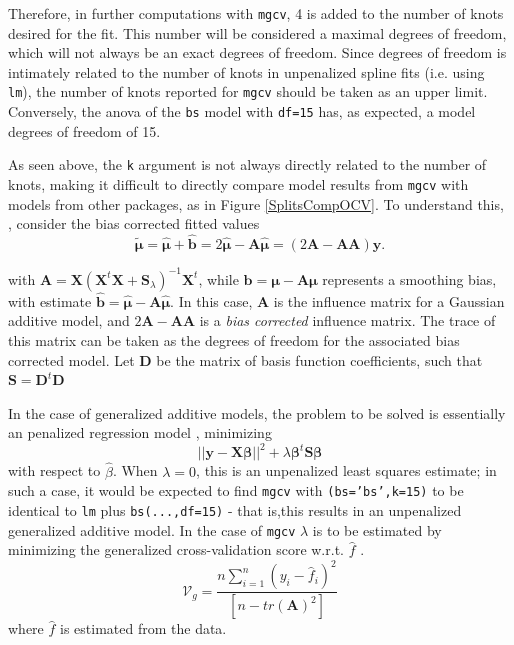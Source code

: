 \documentclass[phdcss]{SDSUThesis}
\begin{document}
Therefore, in further computations with \texttt{mgcv}, 4 is added to the number of knots desired for the fit. This number will be considered a maximal degrees of freedom, which will not always be an exact degrees of freedom. Since degrees of freedom is intimately related to the number of knots in unpenalized spline fits (i.e. using \texttt{lm}), the number of knots reported for \texttt{mgcv} should be taken as an upper limit.
Conversely, the anova of the \texttt{bs} model with \texttt{df=15} has, as expected, a model degrees of freedom of 15. 

As seen above, the \texttt{k} argument is not always directly related to the number of knots, making it difficult to directly compare model results from \texttt{mgcv} with models from other packages, as in Figure \ref{SplitsCompOCV}. To understand this, \cite{wood-2017}, consider the bias corrected fitted values 
\begin{equation}\label{EffectiveDF}
   \tilde{\mathbf{\mu}} = \widehat{\mathbf{\mu}} + \widehat{\mathbf{b}} = 2 \widehat{\mathbf{\mu}} - \mathbf{A} \widehat{\mathbf{\mu}} = \left( 2 \mathbf{A} - \mathbf{A} \mathbf{A}\right) \mathbf{y}.
\end{equation}

with $\mathbf{A} = \mathbf{X} \left(\mathbf{X}^t \mathbf{X} + \mathbf{S}_{\lambda}\right)^{-1} \mathbf{X}^t$, while $\mathbf{b}=\mathbf{\mu}-\mathbf{A}\mathbf{\mu}$ represents a smoothing bias, with estimate $\widehat{\mathbf{b}}=\widehat{\mathbf{\mu}}-\mathbf{A}\widehat{\mathbf{\mu}}$. In this case, $\mathbf{A}$ is the influence matrix for a Gaussian additive model, and $2 \mathbf{A} - \mathbf{A}\mathbf{A}$ is a \textit{bias corrected} influence matrix. The trace of this matrix can be taken as the degrees of freedom for the associated bias corrected model. Let $\mathbf{D}$ be the matrix of basis function coefficients, such that $\mathbf{S} = \mathbf{D}^t\mathbf{D}$

In the case of generalized additive models, the problem to be solved is essentially an penalized regression model \cite{wood-2017}, minimizing
\begin{equation}
   || \mathbf{y} - \mathbf{X} \mathbf{\beta} ||^2 + \lambda \mathbf{\beta}^t \mathbf{S} \mathbf{\beta}
\end{equation}
with respect to $\widehat{\beta}$. When $\lambda=0$, this is an unpenalized least squares estimate; in such a case, it would be expected to find \texttt{mgcv} with \texttt{(bs='bs',k=15)} to be identical to \texttt{lm} plus \texttt{bs(...,df=15)} - that is,this results in an unpenalized generalized additive model. In the case of \texttt{mgcv} $\lambda$ is to be estimated by minimizing the generalized cross-validation score w.r.t. $\widehat{f}$ \cite{wood-2017}. 
\begin{equation}
   \mathcal{V}_g = \frac{n \sum_{i=1}^n \left( y_i - \widehat{f}_i \right)^2}{\left[n - tr\left( \mathbf{A} \right)^2 \right]}
\end{equation}
where $\widehat{f}$ is estimated from the data.
\end{document}
